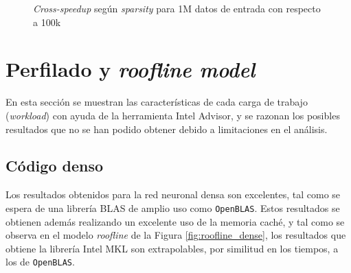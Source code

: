 \begin{figure}[htpb]
    \centering
    \caption{\textit{Cross-speedup} según \textit{sparsity} para 1M datos de entrada con respecto a 100k}
    \label{fig:cross_speedup_1M_100k}
\end{figure}

\section{Perfilado y \textit{roofline model}}
\label{sec:perfilado_roofline}
En esta sección se muestran las características de cada carga de trabajo (\textit{workload}) con ayuda de la herramienta Intel Advisor, y se razonan los posibles resultados que no se han podido obtener debido a limitaciones en el análisis.

\subsection{Código denso}
\label{ssec:codigo_denso_perfilado}
Los resultados obtenidos para la red neuronal densa son excelentes, tal como se espera de una librería BLAS de amplio uso como \texttt{OpenBLAS}. Estos resultados se obtienen además realizando un excelente uso de la memoria caché, y tal como se observa en el modelo \textit{roofline} de la Figura \ref{fig:roofline_dense}, los resultados que obtiene la librería Intel MKL son extrapolables, por similitud en los tiempos, a los de \texttt{OpenBLAS}.

